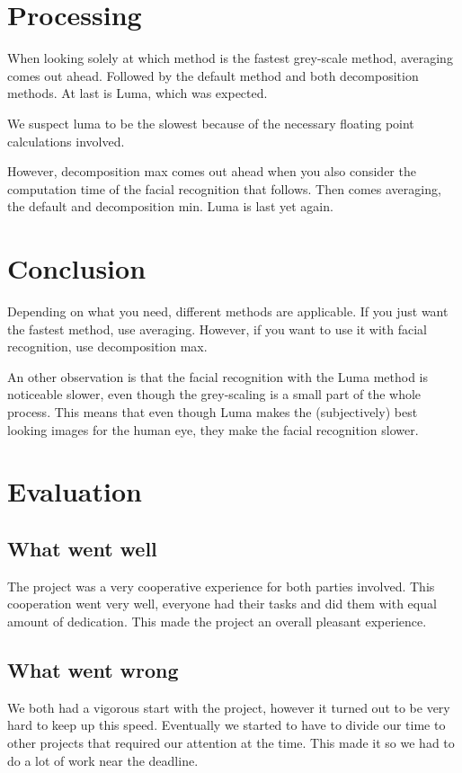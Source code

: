 \documentclass[a4paper]{article}
\begin{document}
\section{Processing}
When looking solely at which method is the fastest grey-scale method, averaging comes out ahead. Followed by the default method and both decomposition methods. At last is Luma, which was expected.

We suspect luma to be the slowest because of the necessary floating point calculations involved. 

However, decomposition max comes out ahead when you also consider the computation time of the facial recognition that follows. Then comes averaging, the default and decomposition min. Luma is last yet again.

\section{Conclusion}
Depending on what you need, different methods are applicable. If you just want the fastest method, use averaging. However, if you want to use it with facial recognition, use decomposition max.

An other observation is that the facial recognition with the Luma method is noticeable slower, even though the grey-scaling is a small part of the whole process. This means that even though Luma makes the (subjectively) best looking images for the human eye, they make the facial recognition slower.

\section{Evaluation}
\subsection{What went well}
The project was a very cooperative experience for both parties involved. This cooperation went very well, everyone had their tasks and did them with equal amount of dedication. This made the project an overall pleasant experience.
\subsection{What went wrong}
We both had a vigorous start with the project, however it turned out to be very hard to keep up this speed. Eventually we started to have to divide our time to other projects that required our attention at the time. This made it so we had to do a lot of work near the deadline.
\end{document}
